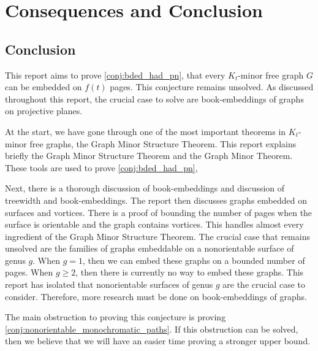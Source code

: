 \chapter{Consequences and Conclusion}\label{chap:conclusion}



\section{Conclusion}
This report aims to prove \cref{conj:bded_had_pn}, that every $K_t$-minor free graph $G$ can be embedded on $f(t)$ pages. This conjecture remains unsolved. 
As discussed throughout this report, the crucial case to solve are book-embeddings of graphs on projective planes. 

At the start, we have gone through one of the most important theorems in $K_t$-minor free graphs, the Graph Minor Structure Theorem. This report explains briefly the Graph Minor Structure Theorem and the Graph Minor Theorem. 
These tools are used to prove \cref{conj:bded_had_pn},

Next, there is a thorough discussion of book-embeddings and discussion of treewidth and book-embeddings. The report then discusses graphs embedded on surfaces and vortices. There is a proof of bounding the number of pages when the surface is orientable and the graph contains vortices. This handles almost every ingredient of the Graph Minor Structure Theorem. The crucial case that remains unsolved are the families of graphs embeddable on a nonorientable surface of genus $g$. When $g = 1$, then we can embed these graphs on a bounded number of pages. When $g \geq 2$, then there is currently no way to embed these graphs. This report has isolated that nonorientable surfaces of genus $g$ are the crucial case to consider. Therefore, more research must be done on book-embeddings of graphs. 

The main obstruction to proving this conjecture is proving \cref{conj:nonorientable_monochromatic_paths}. If this obstruction can be solved, then we believe that we will have an easier time proving a stronger upper bound. 
